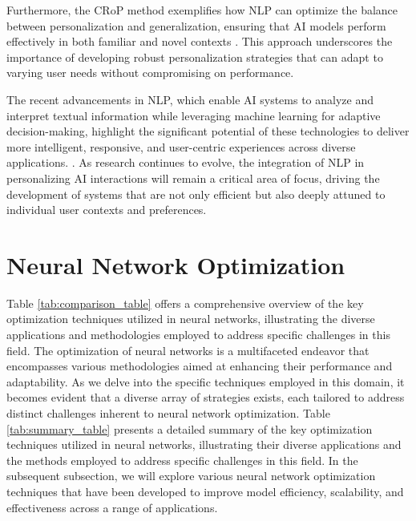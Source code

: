 Furthermore, the CRoP method exemplifies how NLP can optimize the balance between personalization and generalization, ensuring that AI models perform effectively in both familiar and novel contexts \cite{kaur2024cropcontextwiserobuststatic}. This approach underscores the importance of developing robust personalization strategies that can adapt to varying user needs without compromising on performance.



The recent advancements in NLP, which enable AI systems to analyze and interpret textual information while leveraging machine learning for adaptive decision-making, highlight the significant potential of these technologies to deliver more intelligent, responsive, and user-centric experiences across diverse applications. \cite{pandy2024advancementsroboticsprocessautomation}. As research continues to evolve, the integration of NLP in personalizing AI interactions will remain a critical area of focus, driving the development of systems that are not only efficient but also deeply attuned to individual user contexts and preferences.












\section{Neural Network Optimization} \label{sec:Neural Network Optimization}



Table \ref{tab:comparison_table} offers a comprehensive overview of the key optimization techniques utilized in neural networks, illustrating the diverse applications and methodologies employed to address specific challenges in this field. The optimization of neural networks is a multifaceted endeavor that encompasses various methodologies aimed at enhancing their performance and adaptability. As we delve into the specific techniques employed in this domain, it becomes evident that a diverse array of strategies exists, each tailored to address distinct challenges inherent to neural network optimization. Table \ref{tab:summary_table} presents a detailed summary of the key optimization techniques utilized in neural networks, illustrating their diverse applications and the methods employed to address specific challenges in this field. In the subsequent subsection, we will explore various neural network optimization techniques that have been developed to improve model efficiency, scalability, and effectiveness across a range of applications.

